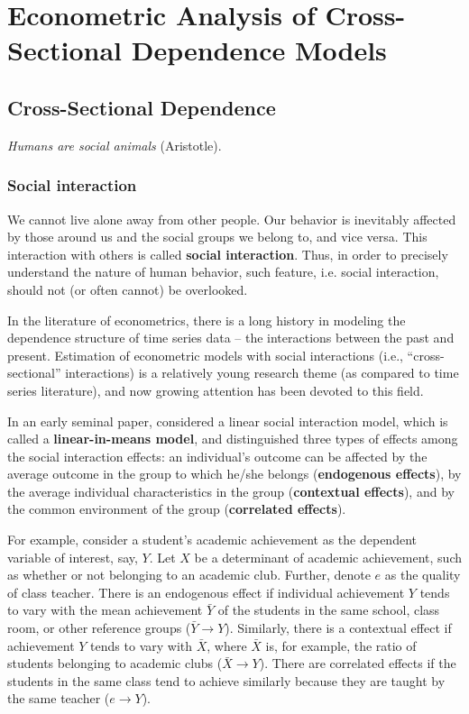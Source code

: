 \documentclass[11pt, A4paper, openany, uplatex]{book}
\begin{document}
\part{Econometric Analysis of Cross-Sectional Dependence Models}
\chapter{Cross-Sectional Dependence}
\begin{center}
	\textit{Humans are social animals} (Aristotle).
\end{center}
\section{Social interaction}
We cannot live alone away from other people.
Our behavior is inevitably affected by those around us and the social groups we belong to, and vice versa.
This interaction with others is called \textbf{social interaction}.
Thus, in order to precisely understand the nature of human behavior, such feature, i.e. social interaction, should not (or often cannot) be overlooked.

In the literature of econometrics, there is a long history in modeling the dependence structure of time series data -- the interactions between the past and present.
Estimation of econometric models with social interactions (i.e., ``cross-sectional'' interactions) is a relatively young research theme (as compared to time series literature), and now growing attention has been devoted to this field.

In an early seminal paper, \cite{manski1993identification} considered a linear social interaction model, which is called a \textbf{linear-in-means model}, and distinguished three types of effects among the social interaction effects: an individual's outcome can be affected by the average outcome in the group to which he/she belongs (\textbf{endogenous effects}), by the average individual characteristics in the group (\textbf{contextual effects}), and by the common environment of the group (\textbf{correlated effects}).

For example, consider a student's academic achievement as the dependent variable of interest, say, $Y$.
Let $X$ be a determinant of academic achievement, such as whether or not belonging to an academic club.
Further, denote $e$ as the quality of class teacher.
There is an endogenous effect if individual achievement $Y$ tends to vary with the mean achievement $\bar{Y}$ of the students in the same school, class room, or other reference groups ($\bar{Y} \to Y$).
Similarly, there is a contextual effect if achievement $Y$ tends to vary with $\bar{X}$, where $\bar{X}$ is, for example, the ratio of students belonging to academic clubs ($\bar{X} \to Y$).
There are correlated effects if the students in the same class tend to achieve similarly because they are taught by the same teacher ($e \to Y$).
\end{document}
